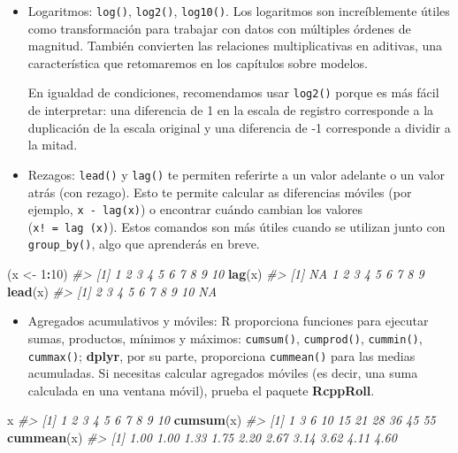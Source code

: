 \documentclass[11pt,oneside]{report}
\newenvironment{Shaded}{\begin{snugshade}}{\end{snugshade}}
\newcommand{\CommentTok}[1]{\textcolor[rgb]{0.56,0.35,0.01}{\textit{#1}}}
\newcommand{\DecValTok}[1]{\textcolor[rgb]{0.00,0.00,0.81}{#1}}
\newcommand{\KeywordTok}[1]{\textcolor[rgb]{0.13,0.29,0.53}{\textbf{#1}}}
\newcommand{\NormalTok}[1]{#1}
\newcommand{\OperatorTok}[1]{\textcolor[rgb]{0.81,0.36,0.00}{\textbf{#1}}}
\newcommand{\StringTok}[1]{\textcolor[rgb]{0.31,0.60,0.02}{#1}}
\providecommand{\tightlist}{%
  \setlength{\itemsep}{0pt}\setlength{\parskip}{0pt}}
\begin{document}
\begin{itemize}
\item
  Logaritmos: \texttt{log()}, \texttt{log2()}, \texttt{log10()}. Los
  logaritmos son increíblemente útiles como transformación para trabajar
  con datos con múltiples órdenes de magnitud. También convierten las
  relaciones multiplicativas en aditivas, una característica que
  retomaremos en los capítulos sobre modelos.

  En igualdad de condiciones, recomendamos usar \texttt{log2()} porque
  es más fácil de interpretar: una diferencia de 1 en la escala de
  registro corresponde a la duplicación de la escala original y una
  diferencia de -1 corresponde a dividir a la mitad.
\item
  Rezagos: \texttt{lead()} y \texttt{lag()} te permiten referirte a un
  valor adelante o un valor atrás (con rezago). Esto te permite calcular
  as diferencias móviles (por ejemplo, \texttt{x\ -\ lag(x)}) o
  encontrar cuándo cambian los valores (\texttt{x!\ =\ lag\ (x)}). Estos
  comandos son más útiles cuando se utilizan junto con
  \texttt{group\_by()}, algo que aprenderás en breve.
\end{itemize}

\begin{Shaded}
\begin{Highlighting}[]
\NormalTok{(x <-}\StringTok{ }\DecValTok{1}\OperatorTok{:}\DecValTok{10}\NormalTok{)}
\CommentTok{#>  [1]  1  2  3  4  5  6  7  8  9 10}
\KeywordTok{lag}\NormalTok{(x)}
\CommentTok{#>  [1] NA  1  2  3  4  5  6  7  8  9}
\KeywordTok{lead}\NormalTok{(x)}
\CommentTok{#>  [1]  2  3  4  5  6  7  8  9 10 NA}
\end{Highlighting}
\end{Shaded}

\begin{itemize}
\tightlist
\item
  Agregados acumulativos y móviles: R proporciona funciones para
  ejecutar sumas, productos, mínimos y máximos: \texttt{cumsum()},
  \texttt{cumprod()}, \texttt{cummin()}, \texttt{cummax()};
  \textbf{dplyr}, por su parte, proporciona \texttt{cummean()} para las
  medias acumuladas. Si necesitas calcular agregados móviles (es decir,
  una suma calculada en una ventana móvil), prueba el paquete
  \textbf{RcppRoll}.
\end{itemize}

\begin{Shaded}
\begin{Highlighting}[]
\NormalTok{x}
\CommentTok{#>  [1]  1  2  3  4  5  6  7  8  9 10}
\KeywordTok{cumsum}\NormalTok{(x)}
\CommentTok{#>  [1]  1  3  6 10 15 21 28 36 45 55}
\KeywordTok{cummean}\NormalTok{(x)}
\CommentTok{#>  [1] 1.00 1.00 1.33 1.75 2.20 2.67 3.14 3.62 4.11 4.60}
\end{Highlighting}
\end{Shaded}
\end{document}
